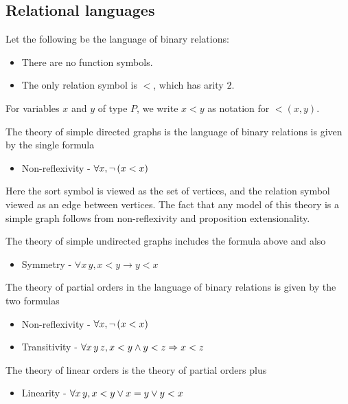 \subsection{Relational languages}

\begin{dfn}
  Let the following be the language of binary relations:
    \begin{itemize}
        \item There are no function symbols.
        \item The only relation symbol is $<$, which has arity $2$.
    \end{itemize}
    For variables $x$ and $y$ of type $P$,
    we write $x < y$ as notation for $<(x,y)$.
\end{dfn}

\begin{dfn}
  The theory of simple directed graphs is the language of binary relations is
  given by the single formula
  \begin{itemize}
    \item Non-reflexivity - $\forall x, \neg\, (x < x)$
  \end{itemize}
  Here the sort symbol is viewed as the set of vertices,
  and the relation symbol viewed as an edge between vertices.
  The fact that any model of this theory is a simple graph
  follows from non-reflexivity and proposition extensionality.

  The theory of simple undirected graphs includes the formula above and also
  \begin{itemize}
    \item Symmetry - $\forall x \, y, x < y \to y < x$
  \end{itemize}
\end{dfn}

\begin{dfn}
    The theory of partial orders in the language of binary relations
    is given by the two formulas
    \begin{itemize}
        \item Non-reflexivity - $\forall x, \neg\, (x < x)$
        \item Transitivity - $\forall x \, y \, z, x < y \land y < z \Rightarrow x < z$
    \end{itemize}
    The theory of linear orders is the theory of partial orders plus
    \begin{itemize}
        \item Linearity - $\forall x \, y, x < y \lor x = y \lor y < x$
    \end{itemize}
\end{dfn}

